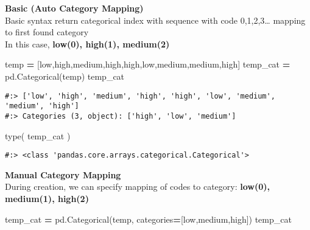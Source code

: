 \documentclass[
]{book}
\newenvironment{Shaded}{\begin{snugshade}}{\end{snugshade}}
\newcommand{\BuiltInTok}[1]{#1}
\newcommand{\NormalTok}[1]{#1}
\newcommand{\OperatorTok}[1]{\textcolor[rgb]{0.43,0.43,0.43}{\textbf{#1}}}
\newcommand{\StringTok}[1]{\textcolor[rgb]{0.5,0.5,0.5}{#1}}
\begin{document}
\textbf{Basic (Auto Category Mapping)}\\
Basic syntax return categorical index with sequence with code 0,1,2,3\ldots{} mapping to first found category\\
In this case, \textbf{low(0), high(1), medium(2)}

\begin{Shaded}
\begin{Highlighting}[]
\NormalTok{temp }\OperatorTok{=}\NormalTok{ [}\StringTok{\textquotesingle{}low\textquotesingle{}}\NormalTok{,}\StringTok{\textquotesingle{}high\textquotesingle{}}\NormalTok{,}\StringTok{\textquotesingle{}medium\textquotesingle{}}\NormalTok{,}\StringTok{\textquotesingle{}high\textquotesingle{}}\NormalTok{,}\StringTok{\textquotesingle{}high\textquotesingle{}}\NormalTok{,}\StringTok{\textquotesingle{}low\textquotesingle{}}\NormalTok{,}\StringTok{\textquotesingle{}medium\textquotesingle{}}\NormalTok{,}\StringTok{\textquotesingle{}medium\textquotesingle{}}\NormalTok{,}\StringTok{\textquotesingle{}high\textquotesingle{}}\NormalTok{]}
\NormalTok{temp\_cat }\OperatorTok{=}\NormalTok{ pd.Categorical(temp)}
\NormalTok{temp\_cat}
\end{Highlighting}
\end{Shaded}

\begin{verbatim}
#:> ['low', 'high', 'medium', 'high', 'high', 'low', 'medium', 'medium', 'high']
#:> Categories (3, object): ['high', 'low', 'medium']
\end{verbatim}

\begin{Shaded}
\begin{Highlighting}[]
\BuiltInTok{type}\NormalTok{( temp\_cat )}
\end{Highlighting}
\end{Shaded}

\begin{verbatim}
#:> <class 'pandas.core.arrays.categorical.Categorical'>
\end{verbatim}

\textbf{Manual Category Mapping}\\
During creation, we can specify mapping of codes to category: \textbf{low(0), medium(1), high(2)}

\begin{Shaded}
\begin{Highlighting}[]
\NormalTok{temp\_cat }\OperatorTok{=}\NormalTok{ pd.Categorical(temp, categories}\OperatorTok{=}\NormalTok{[}\StringTok{\textquotesingle{}low\textquotesingle{}}\NormalTok{,}\StringTok{\textquotesingle{}medium\textquotesingle{}}\NormalTok{,}\StringTok{\textquotesingle{}high\textquotesingle{}}\NormalTok{])}
\NormalTok{temp\_cat}
\end{Highlighting}
\end{Shaded}
\end{document}
